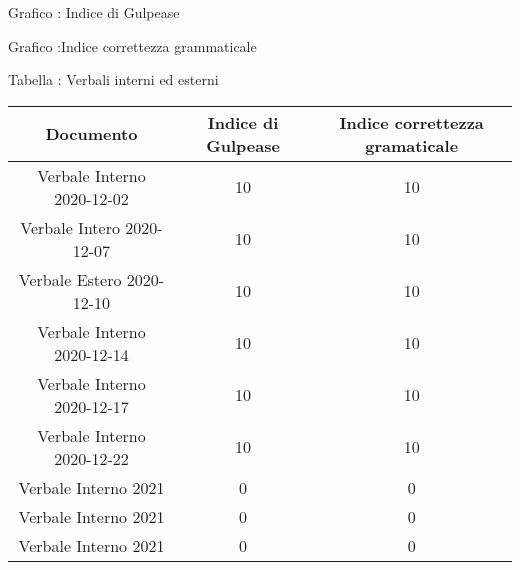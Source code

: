 \begin{center}
    Grafico : Indice di Gulpease

    Grafico :Indice correttezza grammaticale


    Tabella : Verbali interni ed esterni
    \begin{center}
        \begin{longtable}{|c|c|c}
        \hline
        \rowcolor{lighter-grayer}
        \textbf{Documento} & \textbf{Indice di Gulpease} & \textbf{Indice correttezza gramaticale} \\
        \hline
        \endfirsthead


        \hline

        Verbale Interno 2020-12-02 & 10 & 10 \\
        Verbale Intero 2020-12-07& 10 & 10 \\
        Verbale Estero 2020-12-10 & 10 & 10 \\
        Verbale Interno 2020-12-14 & 10 & 10 \\
        Verbale Interno 2020-12-17 & 10 & 10 \\
        Verbale Interno 2020-12-22 & 10 & 10 \\
        Verbale Interno 2021 & 0 & 0 \\
        Verbale Interno 2021 & 0 & 0 \\
        Verbale Interno 2021 & 0 & 0 \\


    
        \hline
    
        \end{longtable}
    \end{center}
\end{center}


